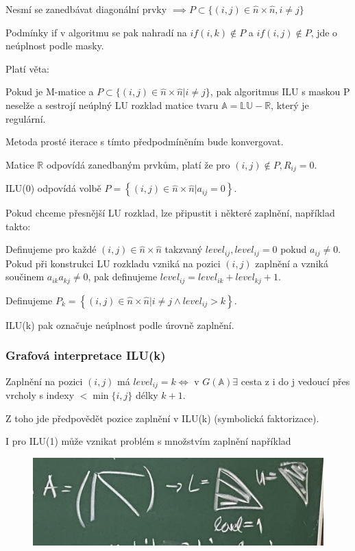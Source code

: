 \documentclass[../main.tex]{subfiles}
\begin{document}
Nesmí se zanedbávat diagonální prvky $\implies P \subset \{(i,j)\in \hat{n} \times \hat{n}, i\neq j \}$

Podmínky if v algoritmu se pak nahradí na $if(i,k)\notin P$ a $if(i,j)\notin P$, jde o neúplnost podle masky.

Platí věta:
\begin{theorem}
    Pokud \matA je M-matice a $P\subset\{(i,j)\in \hat{n} \times \hat{n}| i\neq j\}$, pak algoritmus ILU s maskou P neselže
    a sestrojí neúplný LU rozklad matice \matA tvaru $\mathbb{A} = \mathbb{L} \mathbb{U} - \mathbb{R}$, který je regulární.
    
    Metoda prosté iterace s tímto předpodmíněním bude konvergovat.
\end{theorem}

Matice $\mathbb{R}$ odpovídá zanedbaným prvkům, platí že pro $(i,j)\notin P, R_{ij} = 0$.

ILU(0) odpovídá volbě $  P = \left\{ (i,j) \in \hat{n} \times \hat{n} | a_{ij} = 0 \right\}$.

Pokud chceme přesnější LU rozklad, lze připustit i některé zaplnění, například takto:

Definujeme pro každé $(i,j)\in \hat{n} \times \hat{n} $ takzvaný $level_{ij}, level_{ij}=0$ pokud $a_{ij} \neq 0$.
Pokud při konstrukci LU rozkladu vzniká na pozici $(i,j)$ zaplnění a vzniká součinem $a_{ik} a_{kj} \neq 0$, pak definujeme
$level_{ij} = level_{ik} + level_{kj} + 1$. 

Definujeme $  P_k = \left\{ (i,j) \in \hat{n} \times \hat{n} | i\neq j \wedge level_{ij} > k \right\}$.

ILU(k) pak označuje neúplnost podle úrovně zaplnění. 


\subsubsection{Grafová interpretace ILU(k)}

Zaplnění na pozici $(i,j)$ má $level_{ij} = k \Leftrightarrow$ v $G(\mathbb{A}) \exists$ cesta z i do j vedoucí přes vrcholy s indexy $< \min\{i,j\}$ délky $k+1$.

Z toho jde předpovědět pozice zaplnění v ILU(k) (symbolická faktorizace).

\begin{remark}
    I pro ILU(1) může vznikat problém s množstvím zaplnění například


    \begin{figure}[H]
        \centering
        \includegraphics[width=0.9\linewidth]{images/30-11-ILU1.jpg}
    \end{figure}

\end{remark}
\end{document}
